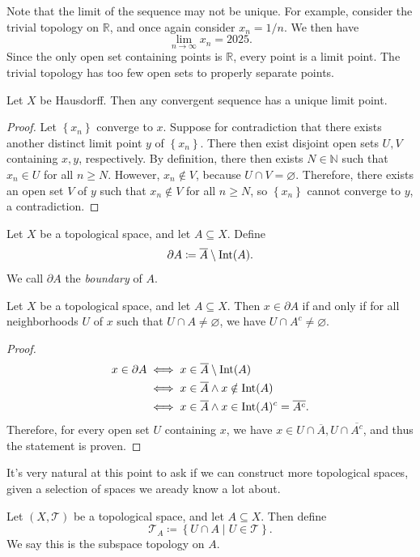 Note that the limit of the sequence may not be unique. For example, consider the trivial topology on $\mathbb{R} $, and once again consider $x_n =1/n$. We then have
\[
	\lim_{n \to \infty} x_n=2025
.\]
Since the only open set containing points is $\mathbb{R} $, every point is a limit point. The trivial topology has too few open sets to properly separate points.
\begin{proposition}\label{prp:2.5}
	Let $X$ be Hausdorff. Then any convergent sequence has a unique limit point.
\end{proposition}
\begin{proof}
	Let $\left\{ x_n \right\} $ converge to $x$. Suppose for contradiction that there exists another distinct limit point $y$ of $\left\{ x_n \right\} $. There then exist disjoint open sets $U,V$ containing $x,y$, respectively. By definition, there then exists $N\in\mathbb{N} $ such that $x_n\in U$ for all $n\geq N$. However, $x_n \notin V$, because $U \cap V=\varnothing $. Therefore, there exists an open set $V$ of $y$ such that $x_n \notin V$ for all $n\geq N$, so $\left\{ x_n \right\} $ cannot converge to $y$, a contradiction.
\end{proof}
\begin{definition}[Boundary]\label{dfn:2.6}
	Let $X$ be a topological space, and let $A\subseteq X$. Define
	\[
		\partial A\coloneqq \overline{A} \setminus \operatorname{Int}(A) 
	.\]
	We call $\partial A$ the \emph{boundary} of $A$.
\end{definition}
\begin{proposition}\label{prp:2.6}
	Let $X$ be a topological space, and let $A\subseteq X$. Then $x\in \partial A$ if and only if for all neighborhoods $U$ of $x$ such that $U \cap A\neq \varnothing $, we have $U \cap A^{c} \neq \varnothing $.
\end{proposition}
\begin{proof}
	\begin{align*}
		x\in \partial A &\iff x\in \overline{A} \setminus \operatorname{Int}(A) \\
				&\iff x\in \overline{A} \land x\notin \operatorname{Int}(A) \\
				&\iff x\in \overline{A} \land x\in \operatorname{Int}(A) ^{c} = \overline{A^{c}} 
	.\end{align*}
	Therefore, for every open set $U$ containing $x$, we have $x\in U \cap \overline{A} ,U \cap \overline{A^{c} } $, and thus the statement is proven.
\end{proof}

It's very natural at this point to ask if we can construct more topological spaces, given a selection of spaces we aready know a lot about.
\begin{definition}\label{dfn:2.7}
	Let $(X,\mathcal{T} )$ be a topological space, and let $A\subseteq X$. Then define
	\[
		\mathcal{T}_A \coloneqq \left\{ U \cap A\mid U\in \mathcal{T}  \right\} 
	.\]
	We say this is the subspace topology on $A$.
\end{definition}


